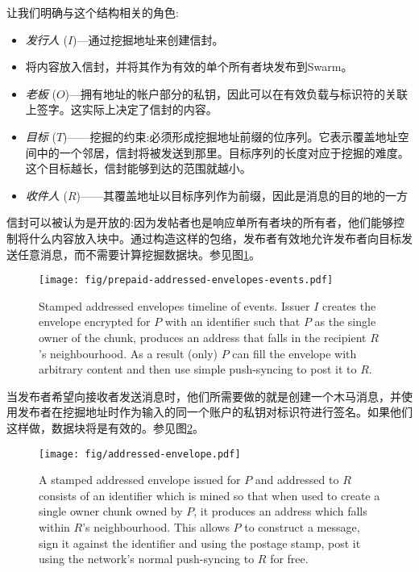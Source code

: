 让我们明确与这个结构相关的角色:

\begin{itemize}
\item \emph{发行人} ($I$)—通过挖掘地址来创建信封。 
\item 将内容放入信封，并将其作为有效的单个所有者块发布到Swarm。
\item \emph{老板} ($O$)—拥有地址的帐户部分的私钥，因此可以在有效负载与标识符的关联上签字。这实际上决定了信封的内容。
\item \emph{目标} ($T$)——挖掘的约束:必须形成挖掘地址前缀的位序列。它表示覆盖地址空间中的一个邻居，信封将被发送到那里。目标序列的长度对应于挖掘的难度。这个目标越长，信封能够到达的范围就越小。
\item \emph{收件人} ($R$)——其覆盖地址以目标序列作为前缀，因此是消息的目的地的一方
\end{itemize}

信封可以被认为是开放的:因为发帖者也是响应单所有者块的所有者，他们能够控制将什么内容放入块中。通过构造这样的包络，发布者有效地允许发布者向目标发送任意消息，而不需要计算挖掘数据块。参见图\ref{fig:addressed-envelope-events}。 


\begin{figure}[htbp]
   \centering
   \texttt{[image: fig/prepaid-addressed-envelopes-events.pdf]}
   \caption[Stamped addressed envelopes timeline of events \statusgreen]{Stamped addressed envelopes timeline of events. Issuer $I$ creates the envelope encrypted for $P$ with an identifier such that $P$ as the single owner of the chunk, produces an address that falls in the recipient $R$'s neighbourhood. As a result (only) $P$ can fill the envelope with arbitrary content and then use simple push-syncing to post it to $R$.}
   \label{fig:addressed-envelope-events}
\end{figure}

当发布者希望向接收者发送消息时，他们所需要做的就是创建一个木马消息，并使用发布者在挖掘地址时作为输入的同一个账户的私钥对标识符进行签名。如果他们这样做，数据块将是有效的。参见图\ref{fig:addressed-envelope}。


\begin{figure}[htbp]
   \centering
   \texttt{[image: fig/addressed-envelope.pdf]}
   \caption[Stamped addressed envelopes \statusgreen]{A stamped addressed envelope issued for $P$ and addressed to $R$ consists of an identifier which is mined so that when used to create a single owner chunk owned by $P$, it produces an address which falls within $R$'s neighbourhood. This allows $P$ to construct a message, sign it against the identifier and using the postage stamp, post it using the network's normal push-syncing to $R$ for free. }
   \label{fig:addressed-envelope}
\end{figure}

